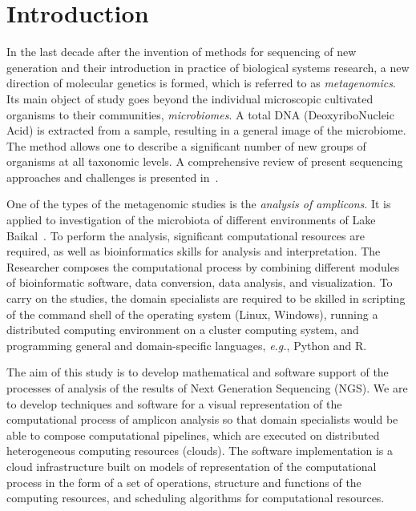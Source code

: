 \documentclass[a4paper]{jpconf}
\begin{document}

\section{Introduction}


In the last decade after the invention of methods for sequencing of new generation and their introduction in practice of biological systems research, a new direction of molecular genetics is formed, which is referred to as \emph{metagenomics}. Its main object of study goes beyond the individual microscopic cultivated organisms to their communities, \emph{microbiomes}. A total DNA (DeoxyriboNucleic Acid) is extracted from a sample, resulting in a general image of the microbiome. The method allows one to describe a significant number of new groups of organisms at all taxonomic levels. A comprehensive review of present sequencing approaches and challenges is presented in~\cite{pere20}.

One of the types of the metagenomic studies is the \emph{analysis of amplicons}. It is applied to investigation of the microbiota of different environments of Lake Baikal~\cite{underice}. To perform the analysis, significant computational resources are required, as well as bioinformatics skills for analysis and interpretation. The Researcher composes the computational process by combining different modules of bioinformatic software, data conversion, data analysis, and visualization. To carry on the studies, the domain specialists are required to be skilled in scripting of the command shell of the operating system (Linux, Windows), running a distributed computing environment on a cluster computing system, and programming general and domain-specific languages, \emph{e.g.}, Python and R.

The aim of this study is to develop mathematical and software support of the processes of analysis of the results of Next Generation Sequencing (NGS). We are to develop techniques and software for a visual representation of the computational process of amplicon analysis so that domain specialists would be able to compose computational pipelines, which are executed on distributed heterogeneous computing resources (clouds). The software implementation is a cloud infrastructure built on models of representation of the computational process in the form of a set of operations, structure and functions of the computing resources, and scheduling algorithms for computational resources.
\end{document}
